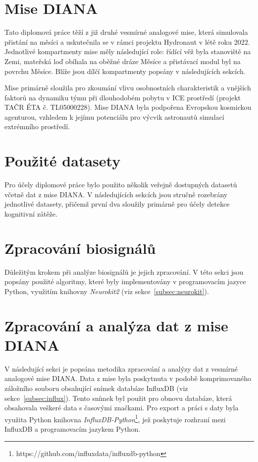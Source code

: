 \section{Mise DIANA}
\label{sec:mise_diana}
Tato diplomová práce těží z již druhé vesmírné analogové mise, která simulovala
přistání na měsíci a uskutečnila se v rámci projektu Hydronaut v létě roku 2022.
Jednotlivé kompartmenty mise měly následující role: řídící věž byla stanoviště
na Zemi, mateřská loď obíhala na oběžné dráze Měsíce a přistávací modul byl na
povrchu Měsíce. Blíže jsou dílčí kompartmenty popsány v následujících sekcích.

Mise primárně sloužila pro zkoumání vlivu osobnostních charakteristik a vnějších
faktorů na dynamiku týmu při dlouhodobém pobytu v \gls{ICE} prostředí (projekt
TAČR ÉTA č. TL05000228). Mise DIANA byla podpořena Evropskou kosmickou
agenturou, vzhledem k jejímu potenciálu pro výcvik astronautů simulací
extrémního prostředí. 


\section{Použité datasety}
\label{sec:datasety}
Pro účely diplomové práce bylo použito několik veřejně dostupných datasetů
včetně dat z mise DIANA. V následujících sekcích jsou stručně rozebrány
jednotlivé datasety, přičemž první dva sloužily primárně pro účely detekce
kognitivní zátěže.


\section{Zpracování biosignálů}
\label{sec:zpracovani_biosignalu}
Důležitým krokem při analýze biosignálů je jejich zpracování. V této sekci jsou
popsány použité algoritmy, které byly implementovány v programovacím jazyce
Python, využitím knihovny \textit{Neurokit2} (viz sekce~\ref{subsec:neurokit}).


\section{Zpracování a analýza dat z mise DIANA}
V následující sekci je popsána metodika zpracování a analýzy dat z vesmírné
analogové mise DIANA. Data z mise byla poskytnuta v podobě komprimovaného
záložního souboru obsahující snímek databáze InfluxDB (viz
sekce~\ref{subsec:influx}). Tento snímek byl použit pro obnovu databáze, která
obsahovala veškeré data s časovými značkami. Pro export a práci s daty byla
využita Python knihovna
\textit{InfluxDB-Python}\footnote{https://github.com/influxdata/influxdb-python},
jež poskytuje rozhraní mezi InfluxDB a programovacím jazykem Python. 
\label{sec:zpracovani_dat_diana}


